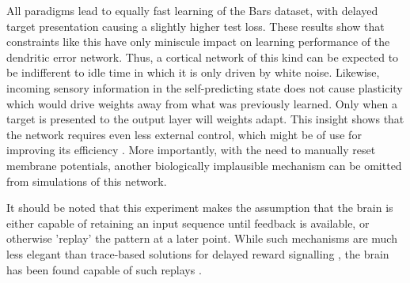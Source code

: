 All paradigms lead to equally fast learning of the Bars dataset, with delayed target presentation causing a slightly
higher test loss. These results show that constraints like this have only miniscule impact on learning performance of
the dendritic error network. Thus, a cortical network of this kind can be expected to be indifferent to idle time in
which it is only driven by white noise. Likewise, incoming sensory information in the self-predicting state does not
cause plasticity which would drive weights away from what was previously learned. Only when a target is presented to the
output layer will weights adapt. This insight shows that the network requires even less external control, which might be
of use for improving its efficiency . More importantly, with the need to manually reset membrane
potentials, another biologically implausible mechanism can be omitted from simulations of this network.

It should be noted that this experiment makes the assumption that the brain is either capable of retaining an input
sequence until feedback is available, or otherwise 'replay' the pattern at a later point. While such mechanisms are much
less elegant than trace-based solutions for delayed reward signalling \citep{bellec2020solution}, the brain has been
found capable of such replays \citep{Marblestone2016}.